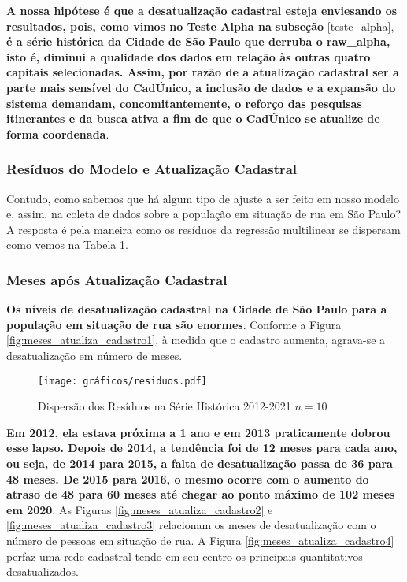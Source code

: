 \documentclass[14pt]{extarticle}
\begin{document}
\textbf{A nossa hipótese é que a desatualização cadastral esteja enviesando os resultados, pois, como vimos no Teste Alpha na subseção} \ref{teste_alpha}, \textbf{é a série histórica da Cidade de São Paulo que derruba o raw\_alpha, isto é, diminui a qualidade dos dados em relação às outras quatro capitais selecionadas. Assim, por razão de a atualização cadastral ser a parte mais sensível do CadÚnico, a inclusão de dados e a expansão do sistema demandam, concomitantemente, o reforço das pesquisas itinerantes e da busca ativa a fim de que o CadÚnico se atualize de forma coordenada}.


\subsubsection{Resíduos do Modelo e Atualização Cadastral}

Contudo, como sabemos que há algum tipo de ajuste a ser feito em nosso modelo e, assim, na coleta de dados sobre a população em situação de rua em São Paulo? A resposta é pela maneira como os resíduos da regressão multilinear se dispersam como vemos na Tabela \ref{fig:residuos}.\\

\subsubsection{Meses após Atualização Cadastral}
\label{atualizacao_cadastral}


\textbf{Os níveis de desatualização cadastral na Cidade de São Paulo para a população em situação de rua são enormes}. Conforme a Figura \ref{fig:meses_atualiza_cadastro1}, à medida que o cadastro aumenta, agrava-se a desatualização em número de meses.\\


\begin{figure}[H]
\centering
	\caption{Dispersão dos Resíduos na Série Histórica 2012-2021 $n = 10$}
	\texttt{[image: gráficos/residuos.pdf]}
	 \label{fig:residuos}%
\end{figure}


\textbf{Em 2012, ela estava próxima a 1 ano e em 2013 praticamente dobrou esse lapso. Depois de 2014, a tendência foi de 12 meses para cada ano, ou seja, de 2014 para 2015, a falta de desatualização passa de 36 para 48 meses. De 2015 para 2016, o mesmo ocorre com o aumento do atraso de 48 para 60 meses até chegar ao ponto máximo de 102 meses em 2020}. As Figuras \ref{fig:meses_atualiza_cadastro2} e \ref{fig:meses_atualiza_cadastro3} relacionam os meses de desatualização com o número de pessoas em situação de rua. A Figura \ref{fig:meses_atualiza_cadastro4} perfaz uma rede cadastral tendo em seu centro os principais quantitativos desatualizados. 
\end{document}
